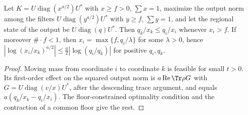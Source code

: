 \begin{lemma}
    \label{lem:filter_clipping}
    \leanok
    Let $K=U\operatorname{diag}(x^{a/2})U^*$ with $x\ge f>0$, $\sum x=1$, maximize
    the output norm among the filters $U\operatorname{diag}(y^{a/2})U^*$ with
    $y\ge f$, $\sum y=1$, and let the regional state of the output be
    $U\operatorname{diag}(q)U^*$. Then $q_k/x_k\le q_i/x_i$ whenever $x_i>f$.
    If moreover $\#\cdot f<1$, then $x_i=\max\{f,q_i/\lambda\}$ for some
    $\lambda>0$, hence $|\log(x_i/x_k)^{a/2}|\le\frac a2|\log(q_i/q_k)|$ for
    positive $q_i,q_k$.
\end{lemma}
\begin{proof}\leanok
    Moving mass from coordinate $i$ to coordinate $k$ is feasible for small
    $t>0$. Its first-order effect on the squared output norm is
    $a\operatorname{Re}\Tr\rho G$ with $G=U\operatorname{diag}(v/x)U^*$, after
    the descending trace argument, and equals $a(q_k/x_k-q_i/x_i)$. The
    floor-constrained optimality condition and the contraction of a common
    floor give the rest.
\end{proof}

